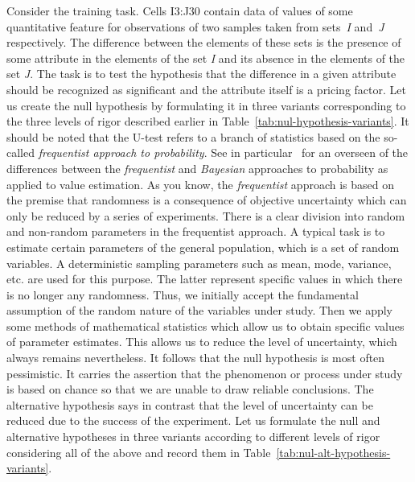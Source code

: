 \documentclass[]{scrreprt}
\begin{document}
Consider the training task. Cells I3:J30 contain data of values of some quantitative feature for observations of two samples taken from sets~\textit{I} and~\textit{J} respectively. The difference between the elements of these sets is the presence of some attribute in the elements of the set \textit{I} and its absence in the elements of the set \textit{J}. The task is to test the hypothesis that the difference in a given attribute should be recognized as significant and the attribute itself is a pricing factor. Let us create the null hypothesis by formulating it in three variants corresponding to the three levels of rigor described earlier in Table~\ref{tab:nul-hypothesis-variants}. It should be noted that the U-test refers to a branch of statistics based on the so-called \emph{frequentist approach to probability}. See in particular~\cite{Murashev:freq-baye-prob} for an overseen of the differences between the \emph{frequentist} and \emph{Bayesian} approaches to probability as applied to value estimation. As you know, the \emph{frequentist} approach is based on the premise that randomness is a consequence of objective uncertainty which can only be reduced by a series of experiments. There is a clear division into random and non-random parameters in the frequentist approach. A typical task is to estimate certain parameters of the general population, which is a set of random variables. A deterministic sampling parameters such as mean, mode, variance, etc. are used for this purpose. The latter represent specific values in which there is no longer any randomness. Thus, we initially accept the fundamental assumption of the random nature of the variables under study. Then we apply some methods of mathematical statistics which allow us to obtain specific values of parameter estimates. This allows us to reduce the level of uncertainty, which always remains nevertheless. It follows that the null hypothesis is most often pessimistic. It carries the assertion that the phenomenon or process under study is based on chance so that we are unable to draw reliable conclusions. The alternative hypothesis says in contrast that the level of uncertainty can be reduced due to the success of the experiment. Let us formulate the null and alternative hypotheses in three variants according to different levels of rigor considering all of the above and record them in Table~\ref{tab:nul-alt-hypothesis-variants}.
%
\end{document}
